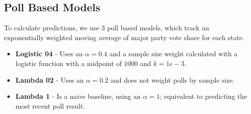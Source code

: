 \subsection{Poll Based Models}
To calculate predictions, we use 3 poll based models, which track an exponentially weighted moving average of major party vote share for each state.

\begin{itemize}
    \item {\bf Logistic 04} - Uses an $\alpha = 0.4$ and a sample size weight calculated with a logistic function with a midpoint of 1000 and $k=1e-3$.
    \item {\bf Lambda 02} - Uses an $\alpha = 0.2$ and does not weight polls by sample size.
    \item {\bf Lambda 1} - Is a naive baseline, using an $\alpha = 1$; equivalent to predicting the most recent poll result.
\end{itemize}